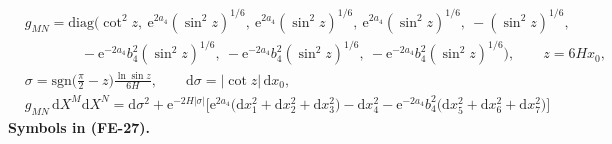 \documentclass[
  10pt,
]{article}
\begin{document}
\[
\begin{aligned}
&g_{MN} = \mathrm{diag}\Big(\cot^2z,\ \mathrm{e}^{2a_4}(\sin^2z)^{1/6},\ \mathrm{e}^{2a_4}(\sin^2z)^{1/6},
 \ \mathrm{e}^{2a_4}(\sin^2z)^{1/6},\ -(\sin^2z)^{1/6},\\
&\qquad\qquad -\mathrm{e}^{-2a_4}b_4^2(\sin^2z)^{1/6},\ -\mathrm{e}^{-2a_4}b_4^2(\sin^2z)^{1/6},
 \ -\mathrm{e}^{-2a_4}b_4^2(\sin^2z)^{1/6}\Big),\qquad z = 6Hx_0,\\
&\sigma = \mathrm{sgn}\Big(\frac{\pi}{2} - z\Big)\frac{\ln\sin z}{6H},\qquad \mathrm{d}\sigma = \lvert\cot z\rvert\,\mathrm{d}x_0,\\
&g_{MN}\,\mathrm{d}X^M\mathrm{d}X^N = \mathrm{d}\sigma^2 + \mathrm{e}^{-2H\lvert\sigma\rvert}\Big[\mathrm{e}^{2a_4}\big(\mathrm{d}x_1^2
 + \mathrm{d}x_2^2 + \mathrm{d}x_3^2\big) - \mathrm{d}x_4^2 - \mathrm{e}^{-2a_4}b_4^2\big(\mathrm{d}x_5^2 + \mathrm{d}x_6^2 + \mathrm{d}x_7^2\big)\Big]
\end{aligned} \tag{FE-27}
\] \textbf{Symbols in (FE-27).}
\end{document}
